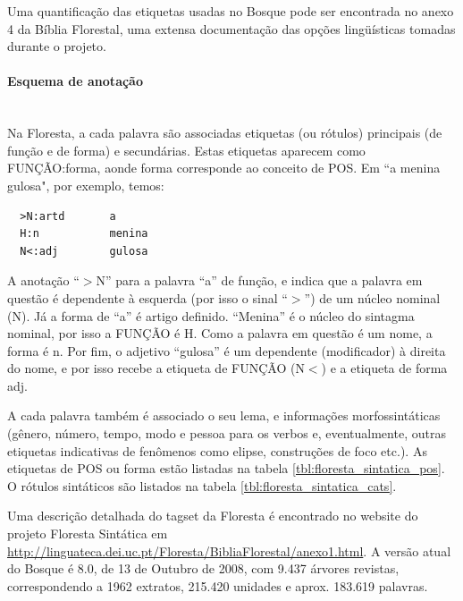 Uma quantificação das etiquetas usadas no Bosque pode ser encontrada no anexo 4 da Bíblia Florestal, uma extensa documentação das opções lingüísticas tomadas durante o projeto.


\paragraph{Esquema de anotação}\label{par:corpus_bosque_esquema}\hspace*{1in}\\

Na Floresta, a cada palavra são associadas etiquetas (ou rótulos) principais (de função e de forma) e secundárias. Estas etiquetas aparecem como FUNÇÃO:forma, aonde forma corresponde ao conceito de POS. Em ``a menina gulosa", por exemplo, temos:

\begin{verbatim}
  >N:artd       a
  H:n           menina
  N<:adj        gulosa
\end{verbatim}

A anotação ``$>$N'' para a palavra ``a'' de função, e indica que a palavra em questão é dependente à esquerda (por isso o sinal ``$>$'') de um núcleo nominal (N). Já a forma de ``a'' é artigo definido. ``Menina'' é o núcleo do sintagma nominal, por isso a FUNÇÃO é H. Como a palavra em questão é um nome, a forma é n. Por fim, o adjetivo ``gulosa'' é um dependente (modificador) à direita do nome, e por isso recebe a etiqueta de FUNÇÃO (N$<$) e a etiqueta de forma adj.

A cada palavra também é associado o seu lema, e informações morfossintáticas (gênero, número, tempo, modo e pessoa para os verbos e, eventualmente, outras etiquetas indicativas de fenômenos como elipse, construções de foco etc.). As etiquetas de POS ou forma estão listadas na tabela \ref{tbl:floresta_sintatica_pos}. O rótulos sintáticos são listados na tabela \ref{tbl:floresta_sintatica_cats}.

Uma descrição detalhada do tagset da Floresta é encontrado no website do projeto Floresta Sintática em \url{http://linguateca.dei.uc.pt/Floresta/BibliaFlorestal/anexo1.html}. A versão atual do Bosque é 8.0, de 13 de Outubro de 2008, com 9.437 árvores revistas, correspondendo a 1962 extratos, 215.420 unidades e aprox. 183.619 palavras.

